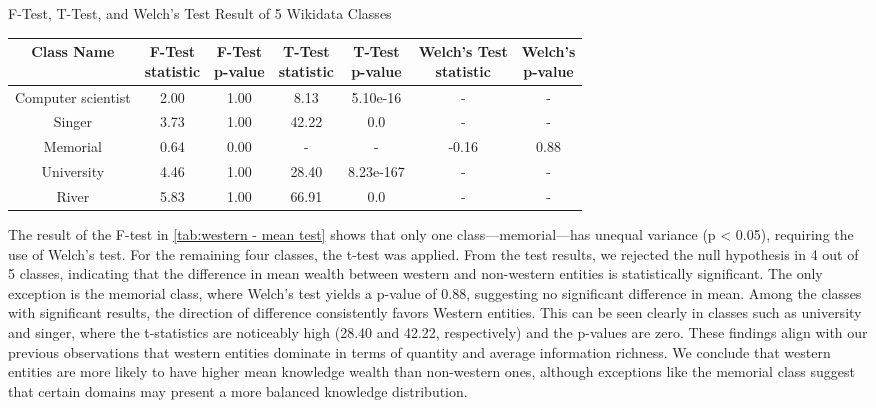 
\begin{center}
\scriptsize
\begin{threeparttable}
\captionsetup{font=small}
\caption{F-Test, T-Test, and Welch's Test Result of 5 Wikidata Classes}
\label{tab:western - mean test}
\begin{tabular}{c | c c c c c c} 
\toprule
    Class Name & \CellWithForceBreak{F-Test \\ statistic} & \CellWithForceBreak{F-Test \\ p-value} & \CellWithForceBreak{T-Test \\ statistic} & \CellWithForceBreak{T-Test \\ p-value} & \CellWithForceBreak{Welch's Test \\ statistic} & \CellWithForceBreak{Welch's \\ p-value} \\ [0.5ex] 
\midrule
    Computer scientist & 2.00 & 1.00 & 8.13 & 5.10e-16 & - & - \\
    Singer & 3.73 & 1.00 & 42.22 & 0.0 & - & - \\
    Memorial & 0.64 & 0.00 & - & - & -0.16 & 0.88 \\
    University & 4.46 & 1.00 & 28.40 & 8.23e-167 & - & - \\
    River & 5.83 & 1.00 & 66.91 & 0.0 & - & - \\
 [1ex]
\bottomrule
\end{tabular}
\begin{tablenotes}
    \scriptsize
    \item{}
\end{tablenotes}
\end{threeparttable}
\end{center}

The result of the F-test in \autoref{tab:western - mean test} shows that only one class—memorial—has unequal variance (p < 0.05), requiring the use of Welch’s test. For the remaining four classes, the t-test was applied. From the test results, we rejected the null hypothesis in 4 out of 5 classes, indicating that the difference in mean wealth between western and non-western entities is statistically significant. The only exception is the memorial class, where Welch’s test yields a p-value of 0.88, suggesting no significant difference in mean. Among the classes with significant results, the direction of difference consistently favors Western entities. This can be seen clearly in classes such as university and singer, where the t-statistics are noticeably high (28.40 and 42.22, respectively) and the p-values are zero. These findings align with our previous observations that western entities dominate in terms of quantity and average information richness. We conclude that western entities are more likely to have higher mean knowledge wealth than non-western ones, although exceptions like the memorial class suggest that certain domains may present a more balanced knowledge distribution.

